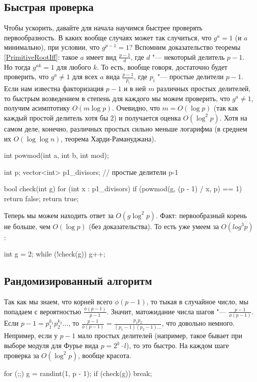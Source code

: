 \subsection{Быстрая проверка}
	Чтобы ускорить, давайте для начала научимся быстрее проверять первообразность.
	В каких вообще случаях может так случиться, что $g^a=1$ (и $a$ минимально), при условии, что $g^{p-1}=1$?
	Вспомним доказательство теоремы \ref{PrimitiveRootIff}: такое $a$ имеет вид $\frac{p-1}{d}$, где $d$ "--- некоторый делитель $p-1$.
	Но тогда $g^{ak}=1$ для любого $k$.
	То есть, вообще говоря, достаточно будет проверить, что $g^a \neq 1$ для всех $a$ вида $\frac{p - 1}{p_i}$, где $p_i$ "--- простые делители $p-1$.
	Если нам известна факторизация $p-1$ и в ней $m$ различных простых делителей, то быстрым возведением в степень для каждого мы можем проверить, что $g^a \neq 1$,
	получим асимптотику $O(m\log p)$.
	Очевидно, что $m = O(\log p)$ (так как каждый простой делитель хотя бы 2) и получается оценка $O(\log^2 p)$.
	Хотя на самом деле, конечно, различных простых сильно меньше логарифма (в среднем их $O(\log \log n)$, теорема Харди-Рамануджана).
\begin{cppcode}
int powmod(int a, int b, int mod);

int p;
vector<int> p1_divisors; // простые делители p-1

bool check(int g) {
    for (int x : p1_divisors) {
        if (powmod(g, (p - 1) / x, p) == 1) {
            return false;
        }
    }
    return true;
}
\end{cppcode}

	Теперь мы можем находить ответ за $O(g \log^2 p)$.
	Факт: первообразный корень не больше, чем $O(\log p)$ (без доказательства).
	То есть уже умеем за $O(log^3 p)$:
\begin{cppcode}
int g = 2;
while (!check(g)) g++;
\end{cppcode}

\subsection{Рандомизированный алгоритм}
	Так как мы знаем, что корней всего $\phi(p-1)$, то тыкая в случайное число, мы попадаем с вероятностью $\frac{\phi(p-1)}{p-1}$.
	Значит, матожидание числа шагов "--- $\frac{p - 1}{\phi(p-1)}$.
	Если $p-1=p_1^{k_1}p_2^{k_2}\dots$, то $\frac{p-1}{\phi(p-1)} = \frac{p_1p_2}{(p_1-1)(p_2-1)\dots}$, что довольно немного.
	Непример, если у $p-1$ мало простых делителей (например, такое бывает при выборе модуля для Фурье вида $p=2^k \cdot l$), то это быстро.
	На каждом шаге проверка за $O(\log^2 p)$, вообще красота.
\begin{cppcode}
for (;;) {
    g = randint(1, p - 1);
    if (check(g)) break;
}
\end{cppcode}
